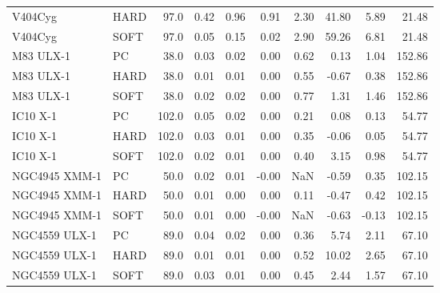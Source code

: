 \begin{tabular}{llrrrrrrrr}
           V404Cyg &  HARD &   97.0 &  0.42 & 0.96 &      0.91 &   2.30 &     41.80 &  5.89 &        21.48 \\
           V404Cyg &  SOFT &   97.0 &  0.05 & 0.15 &      0.02 &   2.90 &     59.26 &  6.81 &        21.48 \\
         M83 ULX-1 &    PC &   38.0 &  0.03 & 0.02 &      0.00 &   0.62 &      0.13 &  1.04 &       152.86 \\
         M83 ULX-1 &  HARD &   38.0 &  0.01 & 0.01 &      0.00 &   0.55 &     -0.67 &  0.38 &       152.86 \\
         M83 ULX-1 &  SOFT &   38.0 &  0.02 & 0.02 &      0.00 &   0.77 &      1.31 &  1.46 &       152.86 \\
          IC10 X-1 &    PC &  102.0 &  0.05 & 0.02 &      0.00 &   0.21 &      0.08 &  0.13 &        54.77 \\
          IC10 X-1 &  HARD &  102.0 &  0.03 & 0.01 &      0.00 &   0.35 &     -0.06 &  0.05 &        54.77 \\
          IC10 X-1 &  SOFT &  102.0 &  0.02 & 0.01 &      0.00 &   0.40 &      3.15 &  0.98 &        54.77 \\
     NGC4945 XMM-1 &    PC &   50.0 &  0.02 & 0.01 &     -0.00 &    NaN &     -0.59 &  0.35 &       102.15 \\
     NGC4945 XMM-1 &  HARD &   50.0 &  0.01 & 0.00 &      0.00 &   0.11 &     -0.47 &  0.42 &       102.15 \\
     NGC4945 XMM-1 &  SOFT &   50.0 &  0.01 & 0.00 &     -0.00 &    NaN &     -0.63 & -0.13 &       102.15 \\
     NGC4559 ULX-1 &    PC &   89.0 &  0.04 & 0.02 &      0.00 &   0.36 &      5.74 &  2.11 &        67.10 \\
     NGC4559 ULX-1 &  HARD &   89.0 &  0.01 & 0.01 &      0.00 &   0.52 &     10.02 &  2.65 &        67.10 \\
     NGC4559 ULX-1 &  SOFT &   89.0 &  0.03 & 0.01 &      0.00 &   0.45 &      2.44 &  1.57 &        67.10 \\
\bottomrule
\end{tabular}
